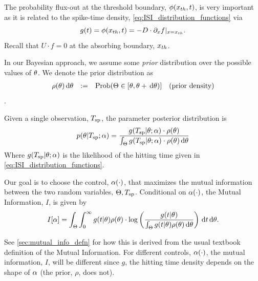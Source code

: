 \documentclass{article}
\begin{document}
The probability flux-out at the threshold boundary, $\phi({ x_{th} }, t)$, is very
important as it is related to the spike-time density,
\cref{eq:ISI_distribution_functions} via 
$$g(t)  = \phi({ x_{th} }, t) = -D\cdot {\partial}_x
f|_{x={ x_{th} }}.$$
Recall that $U \cdot f = 0$ at the absorbing boundary, ${ x_{th} }$.



In our Bayesian approach, we assume some {\sl  prior} distribution over
the possible values of ${\theta}$. We denote the prior distribution as
$$
\begin{array}{rcll} 
\rho({\theta}) \, \mathrm{d} {\theta} &:=& \operatorname{Prob}(\Theta \in [{\theta}, {\theta} + \, \mathrm{d} {\theta})  ] &
 \textrm{(prior density)} 
 \end{array}
$$.

Given a single observation, ${ T_{\textrm{sp} } }$, the parameter posterior 
distribution is 
\begin{equation}
p({\theta}| { T_{\textrm{sp} } }; {\alpha}) =
\frac{g({ T_{\textrm{sp} } } |{\theta}; {\alpha})\cdot \rho({\theta})}{\int_\Theta g({ T_{\textrm{sp} } }|{\theta}; {\alpha})\cdot \rho({\theta})
\, \mathrm{d} {\theta}}
\label{eq:parameter_posterior_defn}
\end{equation} 
Where $ g( { T_{\textrm{sp} } } |{\theta}; {\alpha})$ is the likelihood of the hitting time given in
\cref{eq:ISI_distribution_functions}.

Our goal is to choose the control, ${\alpha}(\cdot)$, that maximizes the mutual
information  between the two random variables, ${\Theta}, { T_{\textrm{sp} } }$. Conditional on
${\alpha}(\cdot)$, the Mutual Information, $I$, is given by
\begin{equation}
I[{\alpha}]= 
\int_\Theta \int_0^\infty g(t|{\theta})\rho({\theta}) \cdot 
\log \left( \frac{g(t|{\theta})}
{\int_\Theta g(t|{\theta})\rho({\theta}) \, \mathrm{d} {\theta}   } \right)
\, \mathrm{d} t\, \mathrm{d} {\theta}.
\label{eq:J_mutual_info_objective}
\end{equation}

See \cref{sec:mutual_info_defn} for how this is derived from the usual textbook
definition of the Mutual Information. For different controls, ${\alpha}(\cdot)$,
the mutual information, $I$, will be different since $g$, the hitting time
density depends on the shape of ${\alpha}$ (the prior, $\rho$, does not). 
  
\end{document}
